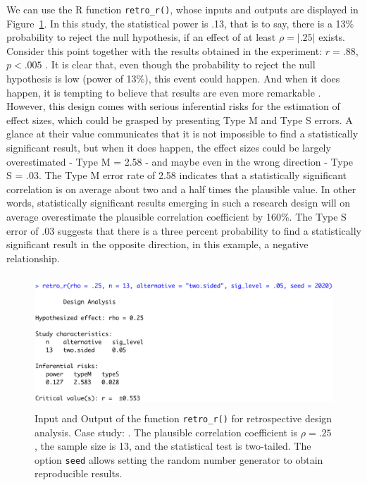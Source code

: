 \documentclass{article}\usepackage[]{graphicx}\usepackage[]{color}
\newcommand{\codestreach}{\renewcommand{\baselinestretch}{1}}{}   %
\begin{document}
We can use the R function \texttt{retro\_r()}, whose inputs and outputs are displayed in Figure~\ref{fig:retro_r}. In this study, the statistical power is .13, that is to say, there is a 13\% probability to reject the null hypothesis, if an effect of at least $\rho=|.25|$ exists. Consider this point together with the results obtained in the experiment: $r = .88$, $p < .005$ \parencite[p. 291]{eisenbergerDoesRejectionHurt2003}. It is clear that, even though the probability to reject the null hypothesis is low (power of 13\%), this event could happen. And when it does happen, it is tempting to believe that results are even more remarkable \parencite{gelmanStatisticalCrisisScience2014}. However, this design comes with serious inferential risks for the estimation of effect sizes, which could be grasped by presenting Type M and Type S errors. A glance at their value communicates that it is not impossible to find a statistically significant result, but when it does happen, the effect sizes could be largely overestimated - Type M = 2.58 - and maybe even in the wrong direction - Type S = .03. The Type M error rate of  2.58 indicates that a statistically significant correlation is on average about two and a half times the plausible value. In other words, statistically significant results emerging in such a research design will on average overestimate the plausible correlation coefficient by 160\%. The Type S error of  .03 suggests that there is a three percent probability to find a statistically significant result in the opposite direction, in this example, a negative relationship.

\codestreach


\begin{figure}[!h]
\centering
  \includegraphics[height=5cm]{screens/retro}
\caption{Input and Output of the function \texttt{retro\_r()} for retrospective design analysis. Case study: \textcite{eisenbergerDoesRejectionHurt2003}. The plausible correlation coefficient is $\rho = .25$, the sample size is 13, and the statistical test is two-tailed. The option \texttt{seed} allows setting the random number generator to obtain reproducible results.}\label{fig:retro_r}
\end{figure}
\end{document}
